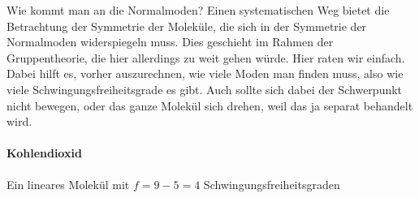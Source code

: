 Wie kommt man an die Normalmoden? Einen systematischen Weg bietet die Betrachtung der Symmetrie der Moleküle, die sich in der Symmetrie der Normalmoden widerspiegeln muss. Dies geschieht im Rahmen der Gruppentheorie, die hier allerdings zu weit gehen würde. Hier raten wir einfach. Dabei hilft es, vorher auszurechnen, wie viele Moden man finden muss, also wie viele Schwingungsfreiheitsgrade es gibt. Auch sollte sich dabei der Schwerpunkt nicht bewegen, oder das ganze Molekül sich drehen, weil das ja separat behandelt wird.

\paragraph{Kohlendioxid} 
Ein lineares Molekül mit $f=9 - 5 = 4$ Schwingungsfreiheitsgraden


